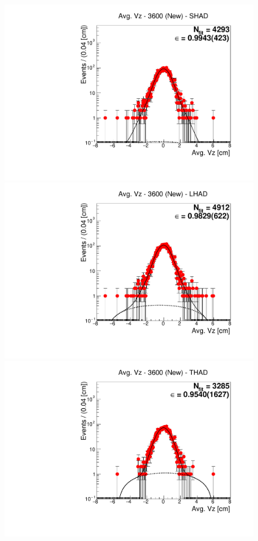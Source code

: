 \begin{figure}[H]
\centering
\includegraphics[scale=0.25]{figures/plots/nonDDbar_fit_results/3650_new/fit_new_3600_data_SHAD.pdf}
\hspace{-0.5cm}
\includegraphics[scale=0.25]{figures/plots/nonDDbar_fit_results/3650_new/fit_new_3600_data_LHAD.pdf}
\hspace{-0.5cm}
\includegraphics[scale=0.25]{figures/plots/nonDDbar_fit_results/3650_new/fit_new_3600_data_THAD.pdf}

\end{figure}
